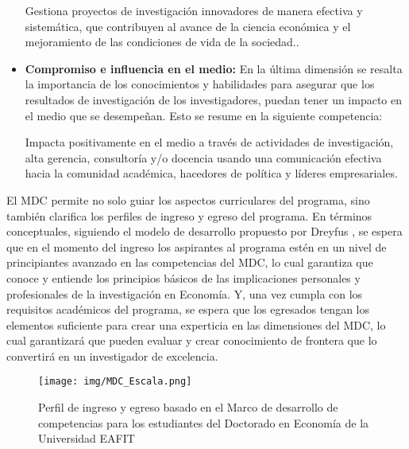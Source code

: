 \begin{itemize}
        \begin{tcolorbox}[colback=red!5!white,colframe=red!75!black]
 Gestiona proyectos de investigación innovadores de manera efectiva y sistemática, que contribuyen al avance de la ciencia económica y el mejoramiento de las condiciones de vida de la sociedad..
\end{tcolorbox}


 \item \textbf{Compromiso e influencia en el medio:} En la última dimensión se resalta la importancia de los conocimientos y habilidades para asegurar que los resultados de investigación de los investigadores, puedan tener un impacto en el medio que se desempeñan. Esto se resume en la siguiente competencia:
    
        \begin{tcolorbox}[colback=red!5!white,colframe=red!75!black]
Impacta positivamente en el medio a través de actividades de investigación, alta gerencia, consultoría y/o docencia usando una comunicación efectiva hacia la comunidad académica, hacedores de política y líderes empresariales.
\end{tcolorbox}
    
\end{itemize}

El  MDC permite no solo guiar los aspectos curriculares del programa, sino también clarifica los perfiles de ingreso y egreso del programa. En términos conceptuales, siguiendo el modelo de desarrollo propuesto por Dreyfus , se espera que en el momento del ingreso los aspirantes al programa estén en un nivel de principiantes avanzado en las competencias del MDC, lo cual garantiza que conoce y entiende los principios básicos de las implicaciones personales y profesionales de la investigación en Economía. Y, una vez cumpla con los requisitos académicos del programa, se espera que los egresados tengan los elementos suficiente para crear una experticia en las dimensiones del MDC, lo cual garantizará que pueden evaluar y crear conocimiento de frontera que lo convertirá en un investigador de excelencia. 

\begin{figure}[H]
\caption{Perfil de ingreso y egreso basado en el Marco de desarrollo de competencias para los estudiantes del Doctorado en Economía de la Universidad EAFIT \label{mdc_niveles} }
\begin{center}
\texttt{[image: img/MDC\_Escala.png]}
\end{center}
\end{figure}

